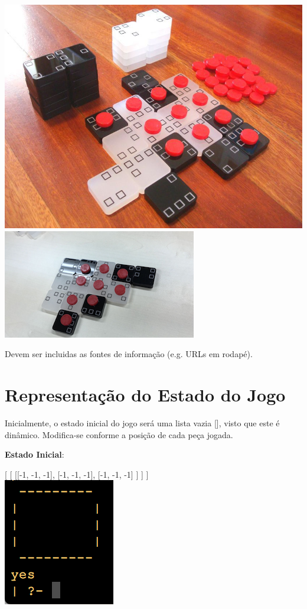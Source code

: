 \documentclass[a4paper]{article}
\begin{document}
\includegraphics[scale=0.3]{../printscreens/niju.jpg} \linebreak
\includegraphics[scale=0.5]{../printscreens/niju2.png} \linebreak

Devem ser incluidas as fontes de informação (e.g. URLs em rodapé).


\section{Representação do Estado do Jogo}

Inicialmente, o estado inicial do jogo será uma lista vazia [], visto que este é dinâmico. Modifica-se conforme a posição de cada peça jogada.

\textbf{Estado Inicial}:

[
  [
      [[-1, -1, -1],
		  [-1, -1, -1],
		  [-1, -1, -1]
		 ]
                      ]
	                 ]\linebreak\linebreak\\

\includegraphics[scale=0.8]{../printscreens/initial_board.png} \linebreak
\end{document}
